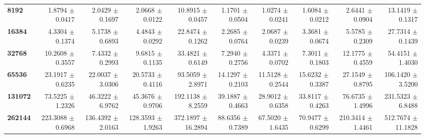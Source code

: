 \begin{tabular}{lrrrrrrrrr}
\textbf{8192}  & 1.8794 $\pm$ 0.0417 & 2.0429 $\pm$ 0.1697 & 2.0668 $\pm$ 0.0122 & 10.8915 $\pm$ 0.0457 & 1.1701 $\pm$ 0.0504 & 1.0274 $\pm$ 0.0241 & 1.6084 $\pm$ 0.0212 & 2.6441 $\pm$ 0.0904 & 13.1419 $\pm$ 0.1317\\
\textbf{16384}  & 4.3304 $\pm$ 0.1374 & 5.1738 $\pm$ 0.6893 & 4.4843 $\pm$ 0.0292 & 22.8474 $\pm$ 0.1262 & 2.2685 $\pm$ 0.0764 & 2.0687 $\pm$ 0.0239 & 3.3681 $\pm$ 0.0674 & 5.5785 $\pm$ 0.2309 & 27.7314 $\pm$ 0.1439\\
\textbf{32768}  & 10.2608 $\pm$ 0.3557 & 7.4332 $\pm$ 0.2993 & 9.6815 $\pm$ 0.1135 & 33.4821 $\pm$ 0.6149 & 7.2940 $\pm$ 0.2756 & 4.3371 $\pm$ 0.0702 & 7.3011 $\pm$ 0.1803 & 12.1775 $\pm$ 0.4559 & 54.4151 $\pm$ 1.4030\\
\textbf{65536}  & 23.1917 $\pm$ 0.6235 & 22.0037 $\pm$ 3.0306 & 20.5733 $\pm$ 0.4116 & 93.5059 $\pm$ 2.8971 & 14.1297 $\pm$ 0.2103 & 11.5128 $\pm$ 0.2544 & 15.6232 $\pm$ 0.3387 & 27.1549 $\pm$ 0.8795 & 106.1420 $\pm$ 3.5200\\
\textbf{131072}  & 73.5225 $\pm$ 1.2326 & 46.3222 $\pm$ 6.9762 & 45.3676 $\pm$ 0.9706 & 192.1138 $\pm$ 8.2559 & 39.1887 $\pm$ 0.4663 & 28.9012 $\pm$ 0.6358 & 33.8117 $\pm$ 0.4263 & 76.6735 $\pm$ 1.4996 & 231.5323 $\pm$ 6.8488\\
\textbf{262144} & 223.3088 $\pm$ 0.6968 & 136.4392 $\pm$ 2.0163 & 128.3593 $\pm$ 1.9263 & 372.1897 $\pm$ 16.2894 & 88.6356 $\pm$ 0.7389 & 67.5020 $\pm$ 1.6435 & 70.9477 $\pm$ 0.6299 & 210.3414 $\pm$ 1.4461 & 512.7674 $\pm$ 11.1828\\
\bottomrule
\end{tabular}
